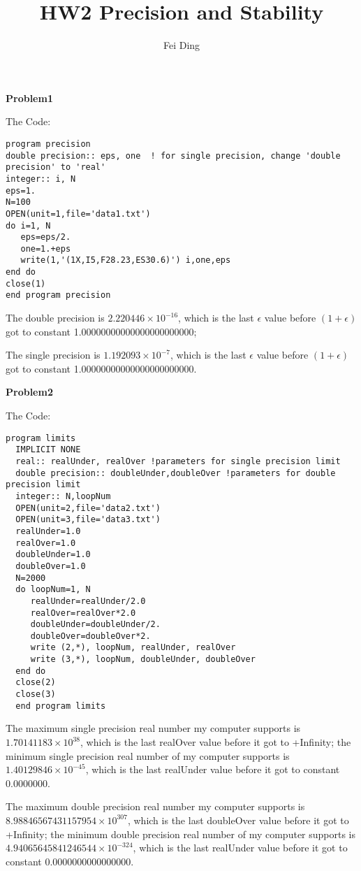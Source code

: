\documentclass{article}
\title{HW2 Precision and Stability}
\author{Fei Ding}
\begin{document}
\maketitle

\textbf{Problem1}

The Code:
\begin{verbatim}
program precision
double precision:: eps, one  ! for single precision, change 'double precision' to 'real'
integer:: i, N
eps=1.
N=100
OPEN(unit=1,file='data1.txt')
do i=1, N
   eps=eps/2.
   one=1.+eps
   write(1,'(1X,I5,F28.23,ES30.6)') i,one,eps
end do
close(1)
end program precision
\end{verbatim}

The double precision is $2.220446\times 10^{-16}$, which is the last $\epsilon$ value before $(1+\epsilon)$ got to constant 1.00000000000000000000000;

The single precision is  $1.192093\times 10^{-7}$, which is the last $\epsilon$ value before $(1+\epsilon)$ got to constant 1.00000000000000000000000.

\vskip 2cm

\textbf{Problem2}

The Code:
\begin{verbatim}
program limits
  IMPLICIT NONE
  real:: realUnder, realOver !parameters for single precision limit
  double precision:: doubleUnder,doubleOver !parameters for double precision limit                
  integer:: N,loopNum
  OPEN(unit=2,file='data2.txt')
  OPEN(unit=3,file='data3.txt')
  realUnder=1.0
  realOver=1.0
  doubleUnder=1.0
  doubleOver=1.0
  N=2000
  do loopNum=1, N
     realUnder=realUnder/2.0
     realOver=realOver*2.0
     doubleUnder=doubleUnder/2.
     doubleOver=doubleOver*2.
     write (2,*), loopNum, realUnder, realOver
     write (3,*), loopNum, doubleUnder, doubleOver
  end do
  close(2)
  close(3)
  end program limits
\end{verbatim}

The maximum single precision real number my computer supports is  $1.70141183\times 10^{38}$, which is the last realOver value before it got to +Infinity; the minimum single precision real number of my computer supports is  $1.40129846\times 10^{-45}$, which is the last realUnder value before it got to constant 0.0000000.

The maximum double precision real number my computer supports is  $8.98846567431157954\times 10^{307}$, which is the last doubleOver value before it got to +Infinity; the minimum double precision real number of my computer supports is  $4.94065645841246544\times 10^{-324}$, which is the last realUnder value before it got to constant 0.0000000000000000.
\end{document}
